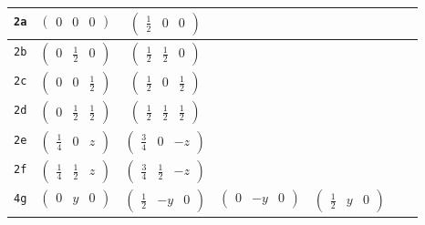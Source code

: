 \documentclass[fleqn,9pt,landscape]{jsarticle}
\begin{document}
\begin{center}
\begin{longtable}{ccccccc}
{\tt 2a} & $ \begin{pmatrix} 0 & 0 & 0 \end{pmatrix} $ & $ \begin{pmatrix} \frac{1}{2} & 0 & 0 \end{pmatrix} $ & $  $ & $  $ & $  $ & $  $ \\ \hline
{\tt 2b} & $ \begin{pmatrix} 0 & \frac{1}{2} & 0 \end{pmatrix} $ & $ \begin{pmatrix} \frac{1}{2} & \frac{1}{2} & 0 \end{pmatrix} $ & $  $ & $  $ & $  $ & $  $ \\ \hline
{\tt 2c} & $ \begin{pmatrix} 0 & 0 & \frac{1}{2} \end{pmatrix} $ & $ \begin{pmatrix} \frac{1}{2} & 0 & \frac{1}{2} \end{pmatrix} $ & $  $ & $  $ & $  $ & $  $ \\ \hline
{\tt 2d} & $ \begin{pmatrix} 0 & \frac{1}{2} & \frac{1}{2} \end{pmatrix} $ & $ \begin{pmatrix} \frac{1}{2} & \frac{1}{2} & \frac{1}{2} \end{pmatrix} $ & $  $ & $  $ & $  $ & $  $ \\ \hline
{\tt 2e} & $ \begin{pmatrix} \frac{1}{4} & 0 & z \end{pmatrix} $ & $ \begin{pmatrix} \frac{3}{4} & 0 & - z \end{pmatrix} $ & $  $ & $  $ & $  $ & $  $ \\ \hline
{\tt 2f} & $ \begin{pmatrix} \frac{1}{4} & \frac{1}{2} & z \end{pmatrix} $ & $ \begin{pmatrix} \frac{3}{4} & \frac{1}{2} & - z \end{pmatrix} $ & $  $ & $  $ & $  $ & $  $ \\ \hline
{\tt 4g} & $ \begin{pmatrix} 0 & y & 0 \end{pmatrix} $ & $ \begin{pmatrix} \frac{1}{2} & - y & 0 \end{pmatrix} $ & $ \begin{pmatrix} 0 & - y & 0 \end{pmatrix} $ & $ \begin{pmatrix} \frac{1}{2} & y & 0 \end{pmatrix} $ & $  $ & $  $ \\ \hline

\end{longtable}
\end{center}
\end{document}
